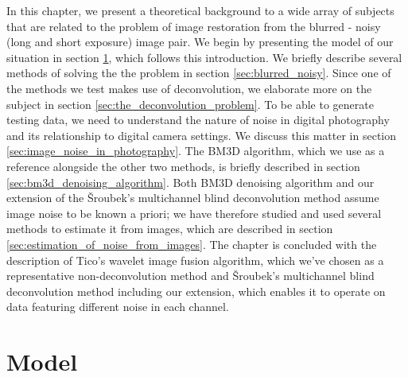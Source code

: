 \documentclass[12pt,notitlepage]{report}
\begin{document}
In this chapter, we present a theoretical background to a wide array of subjects that are related to the problem of image restoration from the blurred - noisy (long and short exposure) image pair. We begin by presenting the model of our situation in section \ref{sec:model}, which follows this introduction. We briefly describe several methods of solving the the problem in section \ref{sec:blurred_noisy}. Since one of the methods we test makes use of deconvolution, we elaborate more on the subject in section \ref{sec:the_deconvolution_problem}. To be able to generate testing data, we need to understand the nature of noise in digital photography and its relationship to digital camera settings. We discuss this matter in section  \ref{sec:image_noise_in_photography}. The BM3D algorithm, which we use as a reference alongside the other two methods, is briefly described in section \ref{sec:bm3d_denoising_algorithm}. Both BM3D denoising algorithm and our extension of the Šroubek's multichannel blind deconvolution method assume image noise to be known a priori; we have therefore studied and used several methods to estimate it from images, which are described in section \ref{sec:estimation_of_noise_from_images}. The chapter is concluded with the description of Tico's wavelet image fusion algorithm, which we've chosen as a representative non-deconvolution method and Šroubek's multichannel blind deconvolution method including our extension, which enables it to operate on data featuring different noise in each channel.    

\clearpage

\section{Model}
\label{sec:model}
\end{document}
